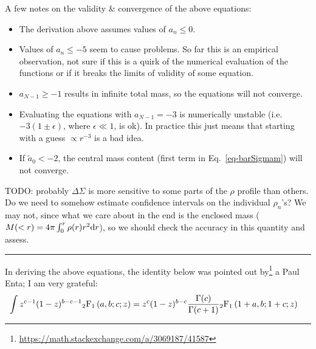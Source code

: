 \documentclass{article}
\begin{document}
A few notes on the validity \& convergence of the above equations:
\begin{itemize}
  \item The derivation above assumes values of $a_n \leq 0$.
  \item Values of $a_n \leq -5$ seem to cause problems. So far this is an empirical observation, not sure if this is a quirk of the numerical evaluation of the functions or if it breaks the limits of validity of some equation.
  \item $a_{N-1} \geq -1$ results in infinite total mass, so the equations will not converge.
  \item Evaluating the equations with $a_{N-1} = -3$ is numerically unstable (i.e. $-3(1\pm\epsilon)$, where $\epsilon \ll 1$, is ok). In practice this just means that starting with a guess $\propto r^{-3}$ is a bad idea.
  \item If $\tilde{a}_0 < -2$, the central mass content (first term in Eq.~\ref{eq-barSigmam}) will not converge.
\end{itemize}

TODO: probably $\Delta\Sigma$ is more sensitive to some parts of the $\rho$ profile than others. Do we need to somehow estimate confidence intervals on the individual $\rho_n$'s? We may not, since what we care about in the end is the enclosed mass ($M(<r)=4\pi\int_0^r\rho(r)r^2{\rm d}r$), so we should check the accuracy in this quantity and assess.

\noindent\rule{.5\textwidth}{.4pt}

In deriving the above equations, the identity below was pointed out by\footnote{\url{https://math.stackexchange.com/a/3069187/41587}} a Paul Enta; I am very grateful:
\begin{align}
\int  z^{c-1 }(1 - z)^{b - c-1}{}_2{\rm F}_1\left( a,b;c;z \right) &= z^c(1 - z)^{b - c}  \frac{\Gamma(c)}{\Gamma(c+1)} {}_2{\rm F}_1\left( 1+a,b;1+c;z \right)
\end{align}
\end{document}
